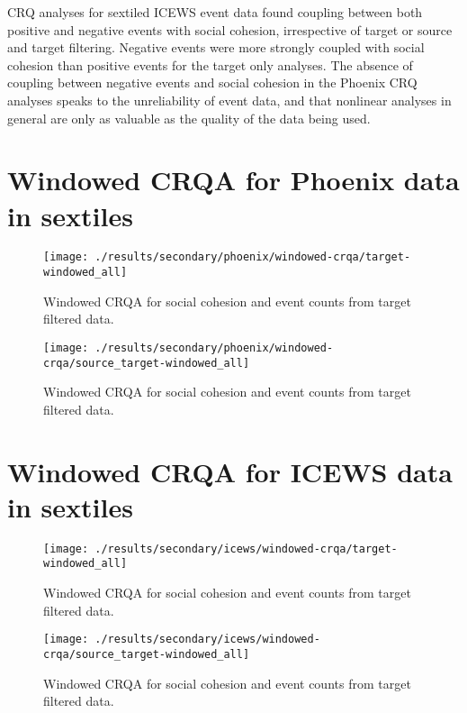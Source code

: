 \documentclass[english,man]{apa6}
\begin{document}
\begin{appendix}
CRQ analyses for sextiled ICEWS event data found coupling between both
positive and negative events with social cohesion, irrespective of
target or source and target filtering. Negative events were more
strongly coupled with social cohesion than positive events for the
target only analyses. The absence of coupling between negative events
and social cohesion in the Phoenix CRQ analyses speaks to the
unreliability of event data, and that nonlinear analyses in general are
only as valuable as the quality of the data being used.

\hypertarget{windowed-crqa-for-phoenix-data-in-sextiles}{%
\section{Windowed CRQA for Phoenix data in
sextiles}\label{windowed-crqa-for-phoenix-data-in-sextiles}}

\begin{figure}
\texttt{[image: ./results/secondary/phoenix/windowed-crqa/target-windowed\_all]} \caption{Windowed CRQA for social cohesion and event counts from target filtered data.}\label{fig:plot-secondary-phoenix-wcrqa-targ-all}
\end{figure}

\begin{figure}
\texttt{[image: ./results/secondary/phoenix/windowed-crqa/source\_target-windowed\_all]} \caption{Windowed CRQA for social cohesion and event counts from target filtered data.}\label{fig:plot-secondary-phoenix-wcrqa-source-targ-all}
\end{figure}

\hypertarget{windowed-crqa-for-icews-data-in-sextiles}{%
\section{Windowed CRQA for ICEWS data in
sextiles}\label{windowed-crqa-for-icews-data-in-sextiles}}

\begin{figure}
\texttt{[image: ./results/secondary/icews/windowed-crqa/target-windowed\_all]} \caption{Windowed CRQA for social cohesion and event counts from target filtered data.}\label{fig:plot-secondary-icews-wcrqa-targ-all}
\end{figure}

\begin{figure}
\texttt{[image: ./results/secondary/icews/windowed-crqa/source\_target-windowed\_all]} \caption{Windowed CRQA for social cohesion and event counts from target filtered data.}\label{fig:plot-secondary-icews-wcrqa-source-targ-all}
\end{figure}
\end{appendix}
\end{document}
